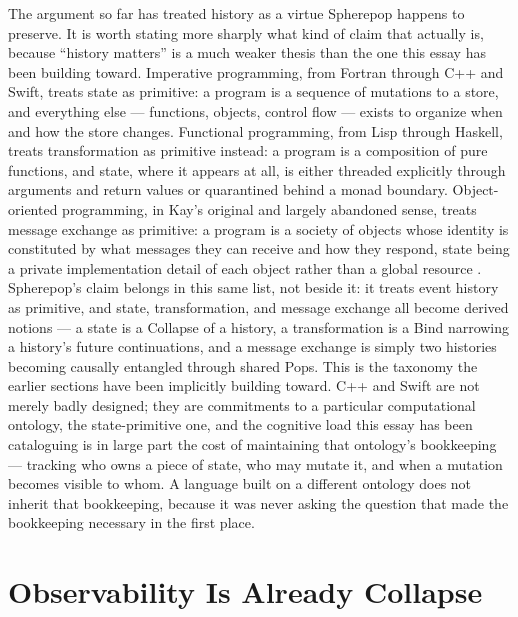 \documentclass[11pt]{article}
\begin{document}
The argument so far has treated history as a virtue Spherepop happens to preserve. It is worth stating more sharply what kind of claim that actually is, because ``history matters'' is a much weaker thesis than the one this essay has been building toward. Imperative programming, from Fortran through C++ and Swift, treats state as primitive: a program is a sequence of mutations to a store, and everything else --- functions, objects, control flow --- exists to organize when and how the store changes. Functional programming, from Lisp through Haskell, treats transformation as primitive instead: a program is a composition of pure functions, and state, where it appears at all, is either threaded explicitly through arguments and return values or quarantined behind a monad boundary. Object-oriented programming, in Kay's original and largely abandoned sense, treats message exchange as primitive: a program is a society of objects whose identity is constituted by what messages they can receive and how they respond, state being a private implementation detail of each object rather than a global resource \cite{kay1993}. Spherepop's claim belongs in this same list, not beside it: it treats event history as primitive, and state, transformation, and message exchange all become derived notions --- a state is a Collapse of a history, a transformation is a Bind narrowing a history's future continuations, and a message exchange is simply two histories becoming causally entangled through shared Pops. This is the taxonomy the earlier sections have been implicitly building toward. C++ and Swift are not merely badly designed; they are commitments to a particular computational ontology, the state-primitive one, and the cognitive load this essay has been cataloguing is in large part the cost of maintaining that ontology's bookkeeping --- tracking who owns a piece of state, who may mutate it, and when a mutation becomes visible to whom. A language built on a different ontology does not inherit that bookkeeping, because it was never asking the question that made the bookkeeping necessary in the first place.

\section{Observability Is Already Collapse}
\end{document}
